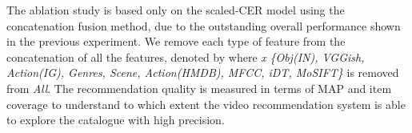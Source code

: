 \documentclass[review]{elsarticle}
\begin{document}
The ablation study is based only on the scaled-CER model using the concatenation fusion method, due to the outstanding overall performance shown in the previous experiment. We remove each type of feature from the concatenation of all the features, denoted by  where \textit{x}  \textit{\{Obj(IN), VGGish, Action(IG), Genres, Scene, Action(HMDB), MFCC, iDT, MoSIFT\}} is removed from \textit{All}. The recommendation quality is measured in terms of MAP and item coverage to understand to which extent the video recommendation system is able to explore the catalogue with high precision. 

			\begin{table}[H]
\caption{Ablation study of the importance of all video content features explored in this work in the overall recommendation quality in terms of MAP and item coverage. \textit{All/x} denotes removing \textit{x} from the concatenation of all the video content features. The best results across the respective metric are highlighted in bold. The box around the  row highlights the highest MAP results obtained in this work.}
  \label{tab:ablation_study}
  \centering
\end{table}
\end{document}

